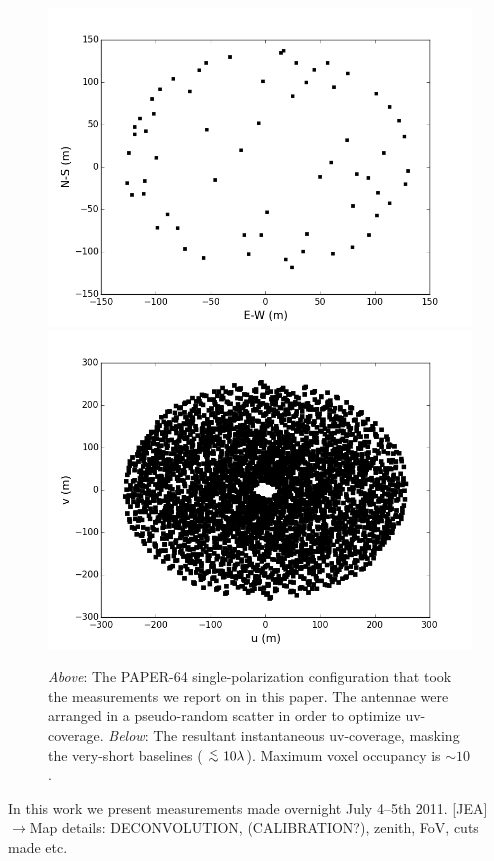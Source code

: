 \documentclass[useAMS,usenatbib]{mn2e}
\newcommand {\aplt} {\ {\raise-.5ex\hbox{$\buildrel<\over\sim$}}\ }
\begin{document}
\begin{figure}
\includegraphics[width=\columnwidth]{psa64imageconfig.png}
\includegraphics[width=\columnwidth]{psa64uvcoverage.png}
\caption{\textit{Above}: The PAPER-64 single-polarization configuration that took the measurements we report on in this paper. The antennae were arranged in a pseudo-random scatter in order to optimize uv-coverage. \textit{Below}: The resultant instantaneous uv-coverage, masking the very-short baselines ($\aplt 10 \lambda$). Maximum voxel occupancy is $\sim10$.}
\label{fig:config}
\end{figure}

In this work we present measurements made overnight July 4--5th 2011.
{\color{blue}[JEA] $\rightarrow$}Map details: DECONVOLUTION, (CALIBRATION?), zenith, FoV, cuts made etc.
\end{document}
